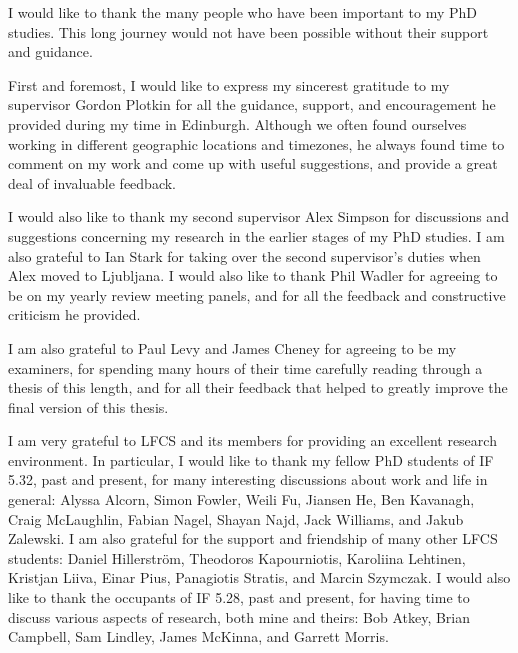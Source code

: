 \documentclass[phd,lfcs,twoside,logo]{infthesis}
\theoremstyle{definition}
\begin{document}
\begin{preliminary}
\begin{laysummary}
\end{laysummary}

\begin{acknowledgements}
I would like to thank the many people who have been important  
to my PhD studies. This long journey would not have been 
possible without their support and guidance.

First and foremost, I would like to express my sincerest gratitude to 
my supervisor Gordon Plotkin for all the guidance, support, and
encouragement he provided during my time in Edinburgh. 
Although we often found ourselves working in different geographic locations 
and timezones, he always found time to comment on my work and 
come up with useful suggestions, and provide a great deal of invaluable feedback.

I would also like to thank my second supervisor Alex Simpson for discussions 
and suggestions concerning my research in the earlier stages of my PhD studies. 
I am also grateful to Ian Stark for taking over the second supervisor's duties when 
Alex moved to Ljubljana. I would also like to thank Phil Wadler for agreeing to be 
on my yearly review meeting panels, and for all the feedback and constructive criticism he 
provided. 

I am also grateful to Paul Levy and James Cheney for agreeing to 
be my examiners, for spending many hours of their time carefully reading through a thesis of this length, 
and for all their feedback that helped to greatly improve 
the final version of this thesis.

I am very grateful to LFCS and its members for providing an excellent research 
environment. In particular, I would like to thank my fellow PhD students of IF 5.32, past and present, for many 
interesting discussions about work and life in general: 
Alyssa Alcorn, Simon Fowler, Weili Fu, Jiansen He, Ben Kavanagh, Craig McLaughlin, Fabian Nagel, 
Shayan Najd, Jack Williams, and Jakub Zalewski. I am also grateful for the support and friendship of many other LFCS students: Daniel Hillerstr\"{o}m, Theodoros Kapourniotis, Karoliina Lehtinen, Kristjan Liiva, Einar Pius, Panagiotis Stratis, and Marcin Szymczak.
I would also like to thank the occupants of IF 5.28, past and present, for having time 
to discuss various aspects of research, both mine and theirs: Bob Atkey, Brian Campbell, Sam Lindley, James McKinna, and Garrett Morris.


\end{acknowledgements}
\end{preliminary}
\end{document}
